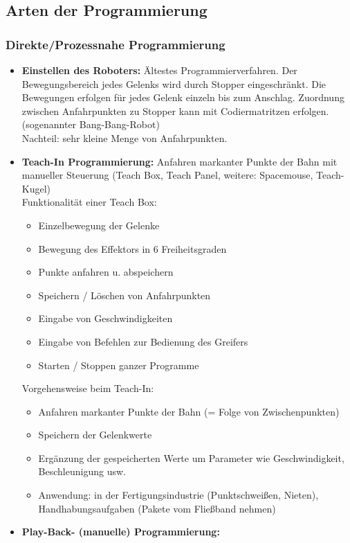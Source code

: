 \subsection{Arten der Programmierung}
\subsubsection{Direkte/Prozessnahe Programmierung}
\begin{itemize}
\item \textbf{Einstellen des Roboters:} Ältestes Programmierverfahren.
Der Bewegungsbereich jedes Gelenks wird durch Stopper eingeschränkt.
Die Bewegungen erfolgen für jedes Gelenk einzeln bis zum Anschlag.
Zuordnung zwischen Anfahrpunkten zu Stopper kann mit Codiermatritzen erfolgen.
(sogenannter \glqq Bang-Bang-Robot\grqq)\\
Nachteil: sehr kleine Menge von Anfahrpunkten.
\item \textbf{Teach-In Programmierung:} Anfahren markanter Punkte der Bahn mit manueller Steuerung
(Teach Box, Teach Panel, weitere: Spacemouse, Teach-Kugel)\\
Funktionalität einer Teach Box:
\begin{itemize}
\item Einzelbewegung der Gelenke
\item Bewegung des Effektors in 6 Freiheitsgraden
\item Punkte anfahren u. abspeichern
\item Speichern / Löschen von Anfahrpunkten
\item Eingabe von Geschwindigkeiten
\item Eingabe von Befehlen zur Bedienung des Greifers
\item Starten / Stoppen ganzer Programme
\end{itemize}
Vorgehensweise beim Teach-In:
\begin{itemize}
\item Anfahren markanter Punkte der Bahn (= Folge von Zwischenpunkten)
\item Speichern der Gelenkwerte
\item Ergänzung der gespeicherten Werte
um Parameter wie Geschwindigkeit, Beschleunigung usw.
\item Anwendung: in der Fertigungsindustrie (Punktschweißen, Nieten), Handhabungsaufgaben (Pakete vom Fließband nehmen)
\end{itemize}
\item \textbf{Play-Back- (manuelle) Programmierung:}
\begin{itemize}

\end{itemize}
\end{itemize}
